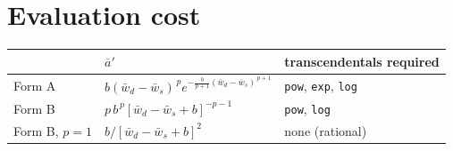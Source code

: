 \documentclass[11pt,a4paper,fontset=none]{ctexart}
\newcommand{\wt}{\left(\bar w_d-\bar w_s\right)}
\newcommand{\bt}{\left[\bar w_d-\bar w_s+b\right]}
\newcommand{\ap}{\bar a'}
\begin{document}
\section{Evaluation cost}

\begin{center}
\begin{tabular}{@{}lll@{}}
\toprule
 & $\ap$ & transcendentals required \\
\midrule
Form A        & $b\wt^{\,p}e^{-\frac{b}{p+1}\wt^{\,p+1}}$ & \texttt{pow}, \texttt{exp}, \texttt{log} \\
Form B        & $p\,b^{\,p}\bt^{-p-1}$                    & \texttt{pow}, \texttt{log} \\
Form B, $p=1$ & $b\big/\bt^{2}$ & none (rational) \\
\bottomrule
\end{tabular}
\end{center}
\end{document}

